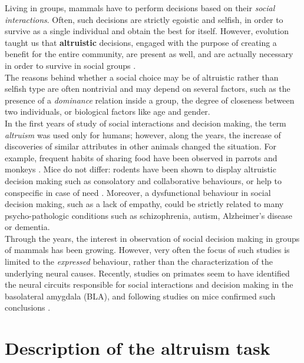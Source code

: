 \documentclass[12pt, a4paper]{report}
\begin{document}
Living in groups, mammals have to perform decisions based on their \textit{social interactions}. Often, such decisions are strictly egoistic and selfish, in order to survive as a single individual and obtain the best for itself. However, evolution taught us that \textbf{altruistic} decisions, engaged with the purpose of creating a benefit for the entire community, are present as well, and are actually necessary in order to survive in social groups \cite{25}. \\%
The reasons behind whether a social choice may be of altruistic rather than selfish type are often nontrivial and may depend on several factors, such as the presence of a \textit{dominance} relation inside a group, the degree of closeness between two individuals, or biological factors like age and gender.\\
In the first years of study of social interactions and decision making, the term \textit{altruism} was used only for humans; however, along the years, the increase of discoveries of similar attributes in other animals changed the situation. For example, frequent habits of sharing food have been observed in parrots \cite{26} %
 and monkeys \cite{27}. %
 Mice do not differ: rodents have been shown to display altruistic decision making such as consolatory and collaborative behaviours, or help to conspecific in case of need \cite{28}. %
Moreover, a dysfunctional behaviour in social decision making, such as a lack of empathy, could be strictly related to many psycho-pathologic conditions such as schizophrenia, autism, Alzheimer's disease or dementia. \\
Through the years, the interest in observation of social decision making in groups of mammals has been growing. However, very often the focus of such studies is limited to the \textit{expressed} behaviour, rather than the characterization of the underlying neural causes. Recently, studies on primates \cite{29} %
 seem to have identified the neural circuits responsible for social interactions and decision making in the basolateral amygdala (BLA), and following studies on mice confirmed such conclusions \cite{30}.%

\section{Description of the altruism task}
\end{document}
